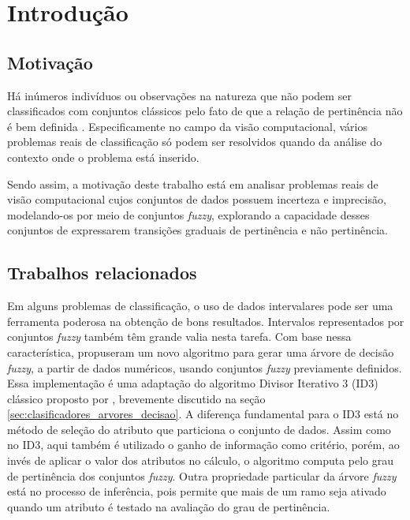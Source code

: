 \chapter{Introdução}
\label{cap:introducao}


\section{Motivação}
\label{sec:consideracoes_preliminares}

Há inúmeros indivíduos ou observações na natureza que não podem ser classificados com conjuntos clássicos pelo fato de que a relação de pertinência não é bem definida \citep{pedrycz:98}. Especificamente no campo da visão computacional, vários problemas reais de classificação só podem ser resolvidos quando da análise do contexto onde o problema está inserido.

Sendo assim, a motivação deste trabalho está em analisar problemas reais de visão computacional cujos conjuntos de dados possuem incerteza e imprecisão, modelando-os por meio de conjuntos \emph{fuzzy}, explorando a capacidade desses conjuntos de expressarem transições graduais de pertinência e não pertinência.


\section{Trabalhos relacionados}
\label{sec:trabalhos_relacionados}

Em alguns problemas de classificação, o uso de dados intervalares pode ser uma ferramenta poderosa na obtenção de bons resultados. Intervalos representados por conjuntos \emph{fuzzy} também têm grande valia nesta tarefa. Com base nessa característica, \citet{umano:94} propuseram um novo algoritmo para gerar uma árvore de decisão \emph{fuzzy}, a partir de dados numéricos, usando conjuntos \emph{fuzzy} previamente definidos. Essa implementação é uma adaptação do algoritmo Divisor Iterativo 3 (ID3) clássico proposto por \citet{quinlan:86}, brevemente discutido na seção \ref{sec:clasificadores_arvores_decisao}. A diferença fundamental para o ID3 está no método de seleção do atributo que particiona o conjunto de dados. Assim como no ID3, aqui também é utilizado o ganho de informação como critério, porém, ao invés de aplicar o valor dos atributos no cálculo, o algoritmo computa pelo grau de pertinência dos conjuntos \emph{fuzzy}. Outra propriedade particular da árvore \emph{fuzzy} está no processo de inferência, pois permite que mais de um ramo seja ativado quando um atributo é testado na avaliação do grau de pertinência.

